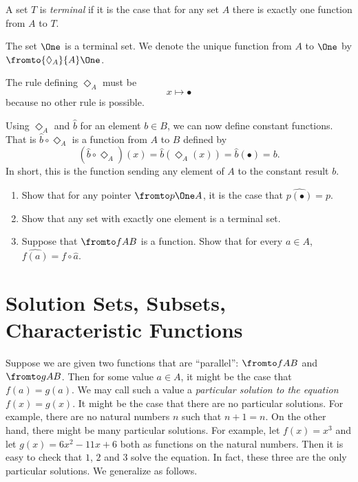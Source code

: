 \begin{defn}\label{def:terminal}
	A set $T$ is \emph{terminal} if it is the case that for any set $A$ there is exactly one function from $A$ to $T$.
\end{defn}

\begin{axiom}
	The set $\One$ is a terminal set. 
	We denote the unique function from $A$ to $\One$ by $\fromto {\Diamond_A}{A}\One$.
	
	The rule defining $\Diamond_A$ must be
	\[x\mapsto\bullet\]
	because no other rule is possible. 
\end{axiom}

Using $\Diamond_A$ and $\hat{b}$ for an element $b\in B$, we can now define constant functions. 
That is $\hat{b}\circ\Diamond_A$ is a function from $A$ to $B$ defined by 
\[(\hat{b}\circ\Diamond_A)(x) = \hat{b}(\Diamond_A(x))= \hat{b}(\bullet) = b.\] 
In short, this is the function sending any element of $A$ to the constant result $b$. 

\begin{exercises}
	\begin{enumerate}
		\item Show that for any pointer $\fromto p\One A$, it is the case that $\widehat{p(\bullet)}=p$.
		\item Show that any set with exactly one element is a terminal set.
		\item Suppose that $\fromto fAB$ is a function. Show that for every $a\in A$, $\widehat{f(a)} = f\circ \hat{a}$.
	\end{enumerate}
\end{exercises}

\section{Solution Sets, Subsets, Characteristic Functions}

Suppose we are given two functions that are ``parallel'': $\fromto fAB$ and $\fromto gAB$.
Then for some value $a\in A$, it might be the case that $f(a)=g(a)$.
We may call such a value a \emph{particular solution to the equation $f(x)=g(x)$}. 
It might be the case that there are no particular solutions.
For example, there are no natural numbers $n$ such that $n+1 = n$. 
On the other hand, there might be many particular solutions. 
For example, let $f(x)=x^3$ and let $g(x)= 6x^2 - 11x + 6$ both as functions on the natural numbers.
Then it is easy to check that $1$, $2$ and $3$ solve the equation.
In fact, these three are the only particular solutions.
We generalize as follows.

